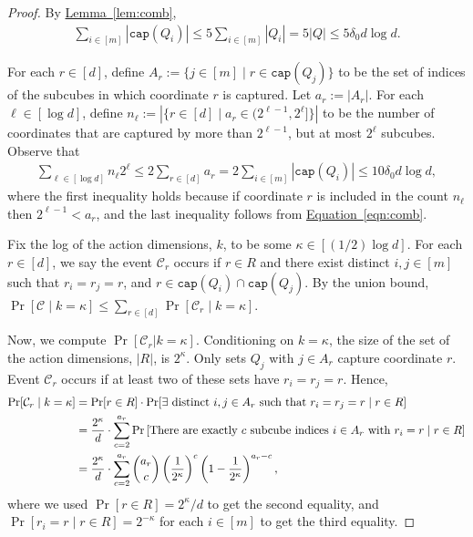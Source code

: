 \documentclass[11pt]{article}
\numberwithin{equation}{section}
\theoremstyle{definition}
\theoremstyle{plain}
\newcommand{\expref}[2]{\hyperref[#2]{#1~\ref{#2}}}
\newcommand{\expeqref}[2]{\hyperref[#2]{#1~\eqref{#2}}}
\newcommand{\cC}{\ensuremath{\mathcal{C}}}
\newcommand{\lbconst}{\ensuremath{\delta_0}}
\newcommand{\capt}{\mathtt{cap}}
\newcommand{\Lem}[1]{\expref{Lemma}{lem:#1}}
\begin{document}
\begin{proof}
By \Lem{comb},
\begin{align}
\sum_{i \in [m]} |\capt(Q_i)| \leq 5 \sum_{i \in [m]} |Q_i|  = 5|Q| \leq 5 \lbconst d\log d. \label{eqn:comb}
\end{align}

For each $r \in [d]$, define $A_r := \{j \in [m]\mid r\in \capt(Q_j)\}$ to be the set of indices of the subcubes in which coordinate $r$ is captured. Let $a_r := |A_r|$.
For each $\ell \in [\log d]$, define $n_\ell := |\{r \in [d]\mid a_r \in (2^{\ell-1},2^{\ell}]\}|$ to be the number of coordinates that are captured by more than $2^{\ell-1}$, but at most $2^\ell$ subcubes.
Observe that
\begin{align}
\sum_{\ell \in [\log d]} n_\ell 2^\ell \leq 2\sum_{r\in [d]} a_r = 2 \sum_{i \in [m]} |\capt(Q_i)| \leq 10 \lbconst d \log d, \label{eqn:006}
\end{align}
where the first inequality holds because if coordinate $r$ is included in the count $n_\ell$ then $2^{\ell-1}<a_r$, and the last inequality follows from \expeqref{Equation}{eqn:comb}.

Fix the log of the action dimensions, $k$, to be some $\kappa \in [({1}/{2})\log d ]$. For each $r\in [d]$, we say the event $\cC_r$ occurs if
 $r \in R$ and there exist distinct $i,j\in [m]$ such that $r_i = r_j = r$, and $r \in \capt(Q_i)\cap\capt(Q_j)$. By the union
bound, $\Pr[\cC \mid k = \kappa] \leq \sum_{r \in [d]} \Pr[\cC_r \mid k = \kappa]$.

Now, we compute $\Pr[\cC_r|k = \kappa]$.
Conditioning on $k = \kappa$, the size of the set of 
the %
action dimensions, $|R|$, is $2^{\kappa}$.
Only sets $Q_j$ with $j \in A_r$ capture coordinate $r$.
Event $\cC_r$ occurs if at least two of these sets have $r_i = r_j = r$. Hence,
\begin{align}
\Pr[\cC_r \mid k = \kappa] & = \Pr[r\in R]\cdot \Pr[\exists \text{ distinct } i,j\in A_r \text{ such that } r_i = r_j = r \mid r \in R] \label{eq:C_r-prob} \\
%
&= \frac{2^{\kappa}}{d} \cdot \sum\limits_{c = 2}^{a_r} \Pr\left[\text{There are exactly $c$ subcube indices } i\in A_r \text{ with } r_i=r \mid r \in R \right] \notag \\
& = \frac{2^{\kappa}}{d}\cdot \sum\limits_{c = 2}^{a_r} \binom{a_r}{c} \left(\frac{1}{2^{\kappa}} \right)^c \left(1-\frac{1}{2^{\kappa}} \right)^{a_r-c}, \label{eq:007}
\end{align}
where we used $\Pr[r \in R] = 2^\kappa/d$ to get the second equality, and $\Pr[r_i = r \mid r \in R] = 2^{-\kappa}$ for each $i \in [m]$ to get the third equality.
%
%


\end{proof}
\end{document}
